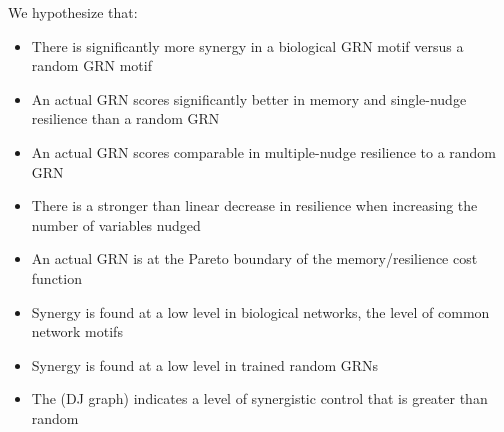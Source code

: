 \documentclass[../main.tex]{subfiles}
\begin{document}
We hypothesize that:

\begin{itemize}
\item There is significantly more synergy in a biological GRN motif versus a random GRN motif
\item An actual GRN scores significantly better in memory and single-nudge resilience than a random GRN
\item An actual GRN scores comparable in multiple-nudge resilience to a random GRN
\item There is a stronger than linear decrease in resilience when increasing the number of variables nudged
\item An actual GRN is at the Pareto boundary of the memory/resilience cost function
\item Synergy is found at a low level in biological networks, the level of common network motifs 
\item Synergy is found at a low level in trained random GRNs
\item The (DJ graph) indicates a level of synergistic control that is greater than random
\end{itemize}
\end{document}
